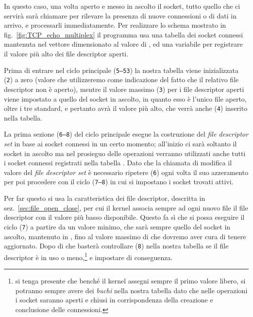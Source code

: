 In questo caso, una volta aperto e messo in ascolto il socket, tutto quello
che ci servirà sarà chiamare  per rilevare la presenza di nuove
connessioni o di dati in arrivo, e processarli immediatamente. Per realizzare
lo schema mostrato in fig.~\ref{fig:TCP_echo_multiplex} il programma usa una
tabella dei socket connessi mantenuta nel vettore  dimensionato
al valore di , ed una variabile  per
registrare il valore più alto dei file descriptor aperti.

Prima di entrare nel ciclo principale (\texttt{\small 5--53}) la nostra
tabella viene inizializzata (\texttt{\small 2}) a zero (valore che
utilizzeremo come indicazione del fatto che il relativo file descriptor non è
aperto), mentre il valore massimo (\texttt{\small 3}) per i file descriptor
aperti viene impostato a quello del socket in ascolto, in quanto esso è
l'unico file aperto, oltre i tre standard, e pertanto avrà il valore più alto,
che verrà anche (\texttt{\small 4}) inserito nella tabella.

La prima sezione (\texttt{\small 6--8}) del ciclo principale esegue la
costruzione del \textit{file descriptor set}  in base ai socket
connessi in un certo momento; all'inizio ci sarà soltanto il socket in ascolto
ma nel prosieguo delle operazioni verranno utilizzati anche tutti i socket
connessi registrati nella tabella .  Dato che la chiamata di
 modifica il valore del \textit{file descriptor set} è necessario
ripetere (\texttt{\small 6}) ogni volta il suo azzeramento per poi procedere
con il ciclo (\texttt{\small 7--8}) in cui si impostano i socket trovati
attivi.

Per far questo si usa la caratteristica dei file descriptor, descritta in
sez.~\ref{sec:file_open_close}, per cui il kernel associa sempre ad ogni nuovo
file il file descriptor con il valore più basso disponibile. Questo fa sì che
si possa eseguire il ciclo (\texttt{\small 7}) a partire da un valore minimo,
che sarà sempre quello del socket in ascolto, mantenuto in ,
fino al valore massimo di  che dovremo aver cura di tenere
aggiornato.  Dopo di che basterà controllare (\texttt{\small 8}) nella nostra
tabella se il file descriptor è in uso o meno,\footnote{si tenga presente che
  benché il kernel assegni sempre il primo valore libero, si potranno sempre
  avere dei \textsl{buchi} nella nostra tabella dato che nelle operazioni i
  socket saranno aperti e chiusi in corrispondenza della creazione e
  conclusione delle connessioni.} e impostare  di conseguenza.

